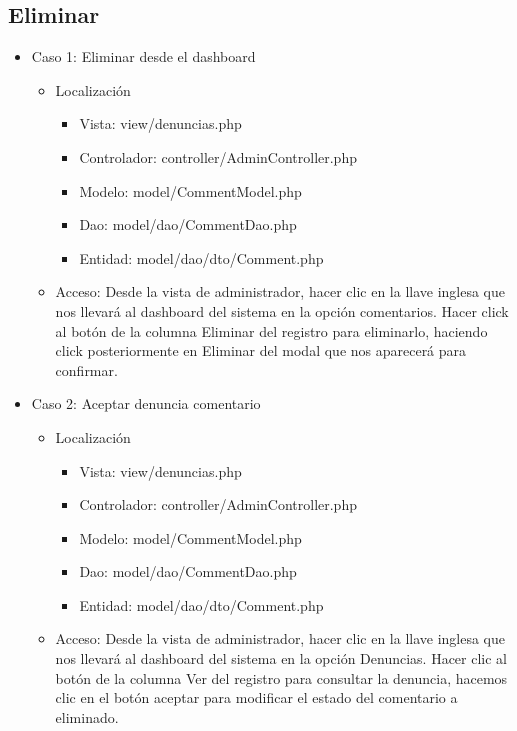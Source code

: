 \subsection{Eliminar}
\begin{itemize}
\item Caso 1: Eliminar desde el dashboard
\begin{itemize}
\item Localizaci\'{o}n
\begin{itemize}
\item Vista: view/denuncias.php
\item Controlador: controller/AdminController.php
\item Modelo: model/CommentModel.php
\item Dao: model/dao/CommentDao.php
\item Entidad: model/dao/dto/Comment.php
\end{itemize}
\item Acceso: Desde la vista de administrador, hacer clic en la llave inglesa que nos llevar\'{a} al dashboard del sistema en la opci\'{o}n comentarios. Hacer click al bot\'{o}n de la columna Eliminar del registro para eliminarlo, haciendo click posteriormente en Eliminar del modal que nos aparecer\'{a} para confirmar.
\end{itemize}
\item Caso 2: Aceptar denuncia comentario
\begin{itemize}
\item Localizaci\'{o}n
\begin{itemize}
\item Vista: view/denuncias.php
\item Controlador: controller/AdminController.php
\item Modelo: model/CommentModel.php
\item Dao: model/dao/CommentDao.php
\item Entidad: model/dao/dto/Comment.php
\end{itemize}
\item Acceso: Desde la vista de administrador, hacer clic en la llave inglesa que nos llevar\'{a} al dashboard del sistema en la opci\'{o}n Denuncias. Hacer clic al bot\'{o}n de la columna Ver del registro para consultar la denuncia, hacemos clic en el bot\'{o}n aceptar para modificar el estado del comentario a eliminado.
\end{itemize}
\end{itemize}
